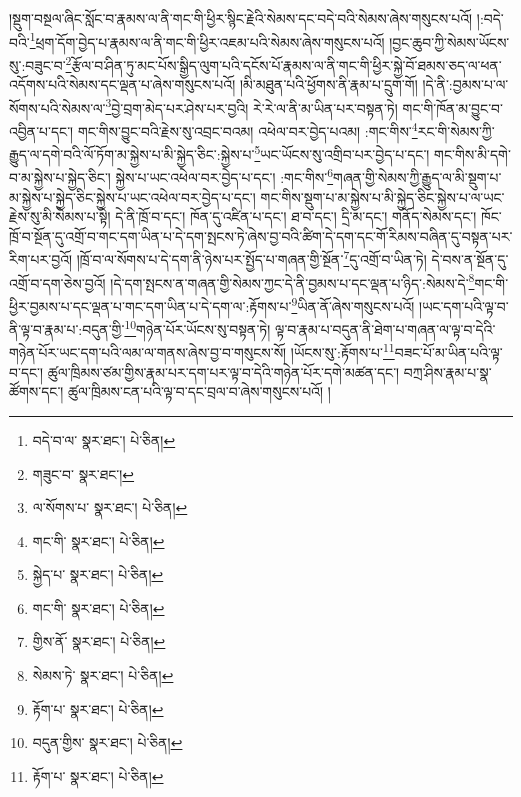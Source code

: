 །སྡུག་བསྔལ་ཞིང་སློང་བ་རྣམས་ལ་ནི་གང་གི་ཕྱིར་སྙིང་རྗེའི་སེམས་དང་བདེ་བའི་སེམས་ཞེས་གསུངས་པའོ། །:བདེ་བའི་\footnote{བདེ་བ་ལ་  སྣར་ཐང་།  པེ་ཅིན། }ཕྲག་དོག་བྱེད་པ་རྣམས་ལ་ནི་གང་གི་ཕྱིར་འཇམ་པའི་སེམས་ཞེས་གསུངས་པའོ། །བྱང་ཆུབ་ཀྱི་སེམས་ཡོངས་སུ་:བཟུང་བ་\footnote{གཟུང་བ་  སྣར་ཐང་། }རྩོལ་བ་ཤིན་ཏུ་མང་པོས་སྒྱིད་ལུག་པའི་དངོས་པོ་རྣམས་ལ་ནི་གང་གི་ཕྱིར་སྐྱེ་བོ་ཐམས་ཅད་ལ་ཕན་འདོགས་པའི་སེམས་དང་ལྡན་པ་ཞེས་གསུངས་པའོ། །མི་མཐུན་པའི་ཕྱོགས་ནི་རྣམ་པ་དྲུག་གོ། །དེ་ནི་:བྱམས་པ་ལ་སོགས་པའི་སེམས་ལ་\footnote{ལ་སོགས་པ་  སྣར་ཐང་།  པེ་ཅིན། }བྱེ་བྲག་མེད་པར་ཤེས་པར་བྱའི། རེ་རེ་ལ་ནི་མ་ཡིན་པར་བསྟན་ཏེ། གང་གི་ཁོན་མ་བྱུང་བ་འབྱིན་པ་དང་། གང་གིས་བྱུང་བའི་རྗེས་སུ་འབྲང་བའམ། འཕེལ་བར་བྱེད་པའམ། :གང་གིས་\footnote{གང་གི་  སྣར་ཐང་།  པེ་ཅིན། }རང་གི་སེམས་ཀྱི་རྒྱུད་ལ་དགེ་བའི་ལོ་ཏོག་མ་སྐྱེས་པ་མི་སྐྱེད་ཅིང་:སྐྱེས་པ་\footnote{སྐྱེད་པ་  སྣར་ཐང་།  པེ་ཅིན། }ཡང་ཡོངས་སུ་འགྲིབ་པར་བྱེད་པ་དང་། གང་གིས་མི་དགེ་བ་མ་སྐྱེས་པ་སྐྱེད་ཅིང་། སྐྱེས་པ་ཡང་འཕེལ་བར་བྱེད་པ་དང་། :གང་གིས་\footnote{གང་གི་  སྣར་ཐང་།  པེ་ཅིན། }གཞན་གྱི་སེམས་ཀྱི་རྒྱུད་ལ་མི་སྡུག་པ་མ་སྐྱེས་པ་སྐྱེད་ཅིང་སྐྱེས་པ་ཡང་འཕེལ་བར་བྱེད་པ་དང་། གང་གིས་སྡུག་པ་མ་སྐྱེས་པ་མི་སྐྱེད་ཅིང་སྐྱེས་པ་ལ་ཡང་རྗེས་སུ་མི་སེམས་པ་སྟེ། དེ་ནི་ཁྲོ་བ་དང་། ཁོན་དུ་འཛིན་པ་དང་། ཐ་བ་དང་། དྲི་མ་དང་། གནོད་སེམས་དང་། ཁོང་ཁྲོ་བ་སྔོན་དུ་འགྲོ་བ་གང་དག་ཡིན་པ་དེ་དག་སྤངས་ཏེ་ཞེས་བྱ་བའི་ཚིག་དེ་དག་དང་གོ་རིམས་བཞིན་དུ་བསྟན་པར་རིག་པར་བྱའོ། །ཁྲོ་བ་ལ་སོགས་པ་དེ་དག་ནི་ཉེས་པར་སྤྱོད་པ་གཞན་གྱི་སྔོན་\footnote{གྱིས་ོན་  སྣར་ཐང་།  པེ་ཅིན། }དུ་འགྲོ་བ་ཡིན་ཏེ། དེ་བས་ན་སྔོན་དུ་འགྲོ་བ་དག་ཅེས་བྱའོ། །དེ་དག་སྤངས་ན་གཞན་གྱི་སེམས་ཀྱང་དེ་ནི་བྱམས་པ་དང་ལྡན་པ་ཉིད་:སེམས་དེ་\footnote{སེམས་ཏེ་  སྣར་ཐང་།  པེ་ཅིན། }གང་གི་ཕྱིར་བྱམས་པ་དང་ལྡན་པ་གང་དག་ཡིན་པ་དེ་དག་ལ་:རྟོགས་པ་\footnote{རྟོག་པ་  སྣར་ཐང་།  པེ་ཅིན། }ཡིན་ནོ་ཞེས་གསུངས་པའོ། །ཡང་དག་པའི་ལྟ་བ་ནི་ལྟ་བ་རྣམ་པ་:བདུན་གྱི་\footnote{བདུན་གྱིས་  སྣར་ཐང་།  པེ་ཅིན། }གཉེན་པོར་ཡོངས་སུ་བསྟན་ཏེ། ལྟ་བ་རྣམ་པ་བདུན་ནི་ཐེག་པ་གཞན་ལ་ལྟ་བ་དེའི་གཉེན་པོར་ཡང་དག་པའི་ལམ་ལ་གནས་ཞེས་བྱ་བ་གསུངས་སོ། །ཡོངས་སུ་:རྟོགས་པ་\footnote{རྟོག་པ་  སྣར་ཐང་།  པེ་ཅིན། }བཟང་པོ་མ་ཡིན་པའི་ལྟ་བ་དང་། ཚུལ་ཁྲིམས་ཙམ་གྱིས་རྣམ་པར་དག་པར་ལྟ་བ་དེའི་གཉེན་པོར་དགེ་མཚན་དང་། བཀྲ་ཤིས་རྣམ་པ་སྣ་ཚོགས་དང་། ཚུལ་ཁྲིམས་ངན་པའི་ལྟ་བ་དང་བྲལ་བ་ཞེས་གསུངས་པའོ། །
